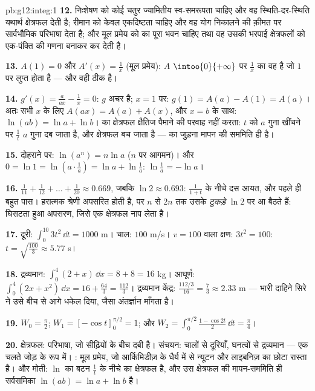 \begin{solution}{pb:g12:integ:1}
\textbf{12.} निःशेषण को कोई चतुर ज्यामितीय स्व-समरूपता चाहिए और वह स्थिति-दर-स्थिति
यथार्थ क्षेत्रफल देती है; रीमान को केवल एकदिष्टता चाहिए और वह योग निकालने की
क़ीमत पर सार्वभौमिक परिभाषा देता है; और मूल प्रमेय को  का पूरा भवन चाहिए
तथा वह उसकी भरपाई क्षेत्रफलों को एक-पंक्ति की गणना बनाकर कर देती है।

\textbf{13.} $A(1) = 0$ और $A'(x) = \frac1x$ (मूल प्रमेय): $A$ $\intoo{0}{+\infty}$ पर $\frac1x$ का वह
 है जो $1$ पर लुप्त होता है --- और वही ठीक  है।

\textbf{14.} $g'(x) = \frac{a}{ax} - \frac1x = 0$: $g$ अचर है; $x = 1$ पर: $g(1) = A(a) - A(1) = A(a)$। अतः सभी $x$ के लिए $A(ax) = A(a) + A(x)$,
और $x = b$ के साथ: $\ln(ab) = \ln a + \ln b$।  का क्षेत्रफल क्षैतिज पैमाने की परवाह नहीं
करता: $t$ को $a$ गुना खींचने पर $\frac1t$ $a$ गुना दब जाता है, और क्षेत्रफल
बच जाता है ---  का जुड़ना मापन की सममिति ही है।

\textbf{15.} दोहराने पर: $\ln(a^n) = n\ln a$ ($n$ पर आगमन)। और $0 = \ln 1 = \ln\left(a \cdot \frac1a\right) =
\ln a + \ln\frac1a$: $\ln\frac1a = -\ln a$।

\textbf{16.} $\frac{1}{11} + \frac{1}{12} + \dots +
\frac{1}{20} \approx 0.669$, जबकि $\ln 2 \approx 0.693$: $\frac{1}{1+t}$ के नीचे दस आयत, और पहले ही बहुत पास।
हरात्मक श्रेणी अपसरित होती है, पर $n$ से $2n$ तक उसके \emph{टुकड़े} $\ln 2$
पर आ बैठते हैं: घिसटता हुआ अपसरण, जिसे एक क्षेत्रफल नाप लेता है।

\textbf{17.} दूरी: $\int_0^{10} 3t^2\,\dd t = 1000$ m।  चाल: $100$ m/s। $v = 100$ वाला क्षण: $3t^2 = 100$:
$t = \sqrt{\frac{100}{3}} \approx 5.77$ s।

\textbf{18.} द्रव्यमान: $\int_0^4 (2 + x)\,\dd x = 8 + 8 = 16$ kg। आघूर्ण: $\int_0^4 (2x + x^2)\,\dd x = 16 + \frac{64}{3} =
\frac{112}{3}$। द्रव्यमान केंद्र: $\frac{112/3}{16} = \frac73 \approx 2.33$ m ---
भारी दाहिने सिरे ने उसे बीच से आगे धकेल दिया, जैसा अंतर्ज्ञान माँगता है।

\textbf{19.} $W_0 = \frac\pi2$; $W_1 = \left[-\cos
t\right]_0^{\pi/2} = 1$; और $W_2 = \int_0^{\pi/2} \frac{1 - \cos 2t}{2}\,\dd t =
\frac\pi4$।

\textbf{20.} क्षेत्रफल: परिभाषा, जो सीढ़ियों के बीच दबी है। संचयन: चालों से
दूरियाँ, घनत्वों से द्रव्यमान ---  एक चलते जोड़ के रूप में। :
मूल प्रमेय, जो आर्किमिडीज़ के धैर्य में से न्यूटन और लाइबनिज़ का छोटा रास्ता
है। और मोती: $\ln$ का बटन $\frac1t$ के नीचे का क्षेत्रफल है, और उस क्षेत्रफल की
मापन-सममिति ही सर्वसमिका $\ln(ab) = \ln a + \ln b$ है।
\end{solution}
